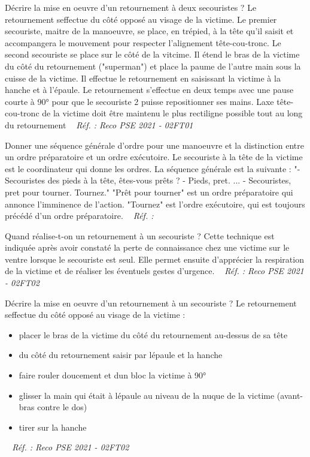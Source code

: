 \documentclass[grid,avery5371,landscape]{flashcards}
\makeatletter
\newcounter{nocarte}
\newcommand{\categ}[1]{%
  \def\@categ{#1}%
  \setcounter{nocarte}{0}%
}
\newcommand{\source}[1]{%
  \medskip
  \itshape%
   ~ \hfill Réf. : #1}
\makeatother
\begin{document}
\color[HTML]{003273}
\categ{PSE}
\begin{flashcard}[geste]{
 Décrire la mise en oeuvre d'un retournement à deux secouristes ?   }
  Le retournement seffectue du côté opposé au visage de la victime.
Le premier secouriste, maitre de la manoeuvre,  se place, en trépied, à la tête qu'il saisit et accompangera le mouvement pour respecter l'alignement tête-cou-tronc.
Le second secouriste se place sur le côté de la vitcime. Il étend le bras de la victime du côté du retournement ("superman") et place la paume de l'autre main sous la cuisse de la victime. Il effectue le retournement en saisissant la victime à la hanche et à l'épaule. 
Le retournement s'effectue en deux temps avec une pause courte à 90° pour que le secouriste 2 puisse repositionner ses mains.
Laxe tête-cou-tronc de la victime doit être maintenu le plus rectiligne possible tout au long du retournement
  \source{Reco PSE 2021 - 02FT01}
\end{flashcard}


\color[HTML]{003273}
\categ{PSE}
\begin{flashcard}[geste]{
 Donner une séquence générale d'ordre pour une manoeuvre et la distinction entre un ordre préparatoire et un ordre exécutoire.   }
  Le secouriste à la tête de la victime est le coordinateur qui donne les ordres. La séquence générale est la suivante :
"-Secouristes des pieds à la tête, êtes-vous prêts ?
- Pieds, pret.
...
- Secouristes, pret pour tourner. Tournez."
"Prêt pour tourner" est un ordre préparatoire qui annonce l'imminence de l'action. "Tournez" est l'ordre exécutoire, qui est toujours précédé d'un ordre préparatoire.
  \source{}
\end{flashcard}


\color[HTML]{003273}
\categ{PSE}
\begin{flashcard}[geste]{
 Quand réalise-t-on un retournement à un secouriste ?   }
  Cette technique est indiquée après avoir constaté la perte de connaissance chez une victime sur le ventre lorsque le secouriste est seul. Elle permet ensuite d'apprécier la respiration de la victime et de réaliser les éventuels gestes d'urgence.
  \source{Reco PSE 2021 - 02FT02}
\end{flashcard}


\color[HTML]{003273}
\categ{PSE}
\begin{flashcard}[geste]{
 Décrire la mise en oeuvre d'un retournement à un  secouriste ?   }
  Le retournement seffectue du côté opposé au visage de la victime : 
\begin{itemize}
\item placer le bras de la victime du côté du retournement au-dessus de sa tête
\item du côté du retournement saisir par lépaule et la hanche 
\item faire rouler doucement et dun bloc la victime à 90°
\item glisser la main qui était à lépaule au niveau de la nuque de la victime (avant-bras contre le dos)
\item tirer sur la hanche
\end{itemize}
  \source{Reco PSE 2021 - 02FT02}
\end{flashcard}
\end{document}
